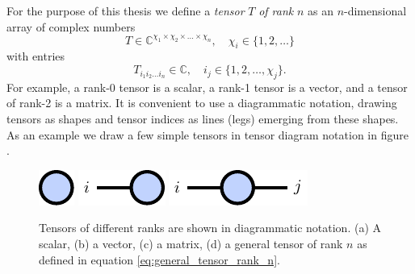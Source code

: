 For the purpose of this thesis we define a \textit{tensor} $T$ \textit{of rank} $n$ as an $n$-dimensional array of complex numbers
\begin{equation}
	\label{eq:general_tensor_rank_n}
	T \in \mathbb{C}^{\chi_1\times\chi_2\times\dots\times\chi_n}, \quad \chi_i \in \{1, 2, \dots\}
\end{equation}
with entries
\begin{equation}
	T_{i_1i_2\dots i_n} \in \mathbb{C}, \quad i_j \in \{1, 2, \dots, \chi_j\}.
\end{equation}
For example, a rank-0 tensor is a scalar, a rank-1 tensor is a vector, and a tensor of rank-2 is a matrix. It is convenient to use a diagrammatic notation, drawing tensors as shapes and tensor indices as lines (legs) emerging from these shapes. As an example we draw a few simple tensors in tensor diagram notation in figure . \par
\begin{figure}[h]
	\centering
	\subcaptionbox{\label{fig:basic_tensor_diagrams_scalar}}
	{%
		\raisebox{\dimexpr.5\ht\largestimage-.5\height}
		{%
			\includegraphics[scale=1]{figures/tikz/Tensor_Networks/basic_diagrams/basic_diagrams_a.pdf}
		}
	}
	\subcaptionbox{\label{fig:basic_tensor_diagrams_vector}}
	{%
		\raisebox{\dimexpr.5\ht\largestimage-.5\height}
		{%
			\includegraphics[scale=1]{figures/tikz/Tensor_Networks/basic_diagrams/basic_diagrams_b.pdf}
		}
	}
	\subcaptionbox{\label{fig:basic_tensor_diagrams_matrix}}
	{%
		\raisebox{\dimexpr.5\ht\largestimage-.5\height}
		{%
			\includegraphics[scale=1]{figures/tikz/Tensor_Networks/basic_diagrams/basic_diagrams_c.pdf}
		}
	}
	\subcaptionbox{\label{fig:basic_tensor_diagrams_rank_n_tensor}}
	{%
		\usebox{\largestimage}
	}
\caption{Tensors of different ranks are shown in diagrammatic notation. (a) A scalar, (b) a vector, (c) a matrix, (d) a general tensor of rank $n$ as defined in equation \eqref{eq:general_tensor_rank_n}. }
\label{fig:basic_tensor_diagrams}
\end{figure}
